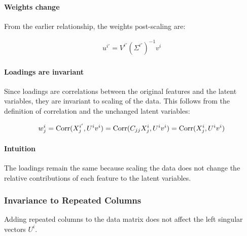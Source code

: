 \paragraph{Weights change}

From the earlier relationship, the weights post-scaling are:

\begin{align}
    u^{i'} = V^{i'}(\Sigma^{i'})^{-1}v^{i} \label{eq:weights_change}
\end{align}

\paragraph{Loadings are invariant}

Since \gls{loadings} are correlations between the original features and the latent variables, they are invariant to scaling of the data.
This follows from the definition of correlation and the unchanged latent variables:

\begin{align}
    w^{i}_j = \operatorname{Corr}(X^{i'}_j, U^{i}v^{i}) = \operatorname{Corr}(C_{jj}X^{i}_j, U^{i}v^{i}) = \operatorname{Corr}(X^{i}_j, U^{i}v^{i}) \label{eq:loading_invariant}
\end{align}

\paragraph{Intuition}
The \gls{loadings} remain the same because scaling the data does not change the relative contributions of each feature to the latent variables.

\subsubsection{Invariance to Repeated Columns}\label{subsubsec:invariance-to-repeated-columns}

\begin{lemma}
Adding repeated columns to the data matrix does not affect the left singular vectors $U^{i}$.
\end{lemma}

